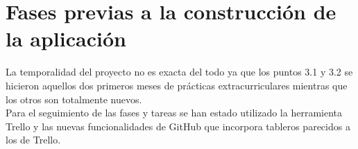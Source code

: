 \chapter{Fases previas a la construcción de la aplicación}
\graphicspath{{imagenes/estructura_y_desarrollo/}}

La temporalidad del proyecto no es exacta del todo ya que los puntos 3.1 y 3.2 se hicieron aquellos dos primeros meses de prácticas extracurriculares mientras que los otros son totalmente nuevos. 
\\Para el seguimiento de las fases y tareas se han estado utilizado la herramienta Trello y las nuevas funcionalidades de GitHub que incorpora tableros parecidos a los de Trello.



